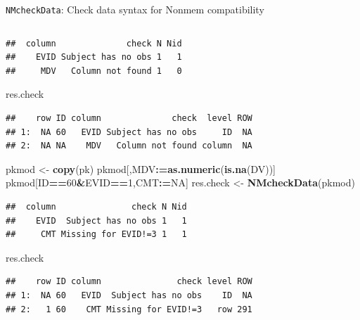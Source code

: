 \documentclass[
  8pt,
  ignorenonframetext,
  aspectratio=169]{beamer}
\newenvironment{Shaded}{\begin{snugshade}}{\end{snugshade}}
\newcommand{\DecValTok}[1]{\textcolor[rgb]{0.00,0.00,0.81}{#1}}
\newcommand{\ErrorTok}[1]{\textcolor[rgb]{0.64,0.00,0.00}{\textbf{#1}}}
\newcommand{\KeywordTok}[1]{\textcolor[rgb]{0.13,0.29,0.53}{\textbf{#1}}}
\newcommand{\NormalTok}[1]{#1}
\newcommand{\OperatorTok}[1]{\textcolor[rgb]{0.81,0.36,0.00}{\textbf{#1}}}
\newcommand{\OtherTok}[1]{\textcolor[rgb]{0.56,0.35,0.01}{#1}}
\newcommand{\StringTok}[1]{\textcolor[rgb]{0.31,0.60,0.02}{#1}}
\begin{document}
\begin{frame}[fragile]{\texttt{NMcheckData}: Check data syntax for
Nonmem compatibility}
\begin{columns}[T]
\begin{column}{0.48\textwidth}
\begin{verbatim}
##  column              check N Nid
##    EVID Subject has no obs 1   1
##     MDV   Column not found 1   0
\end{verbatim}

\begin{Shaded}
\begin{Highlighting}[]
\NormalTok{res.check}
\end{Highlighting}
\end{Shaded}

\begin{verbatim}
##    row ID column              check  level ROW
## 1:  NA 60   EVID Subject has no obs     ID  NA
## 2:  NA NA    MDV   Column not found column  NA
\end{verbatim}

\begin{Shaded}
\begin{Highlighting}[]
\NormalTok{pkmod \textless{}{-}}\StringTok{ }\KeywordTok{copy}\NormalTok{(pk)}
\NormalTok{pkmod[,MDV}\OperatorTok{:}\ErrorTok{=}\KeywordTok{as.numeric}\NormalTok{(}\KeywordTok{is.na}\NormalTok{(DV))]}
\NormalTok{pkmod[ID}\OperatorTok{==}\DecValTok{60}\OperatorTok{\&}\NormalTok{EVID}\OperatorTok{==}\DecValTok{1}\NormalTok{,CMT}\OperatorTok{:}\ErrorTok{=}\OtherTok{NA}\NormalTok{]}
\NormalTok{res.check \textless{}{-}}\StringTok{ }\KeywordTok{NMcheckData}\NormalTok{(pkmod)}
\end{Highlighting}
\end{Shaded}

\begin{verbatim}
##  column               check N Nid
##    EVID  Subject has no obs 1   1
##     CMT Missing for EVID!=3 1   1
\end{verbatim}

\begin{Shaded}
\begin{Highlighting}[]
\NormalTok{res.check}
\end{Highlighting}
\end{Shaded}

\begin{verbatim}
##    row ID column               check level ROW
## 1:  NA 60   EVID  Subject has no obs    ID  NA
## 2:   1 60    CMT Missing for EVID!=3   row 291
\end{verbatim}
\end{column}
\end{columns}
\end{frame}
\end{document}

